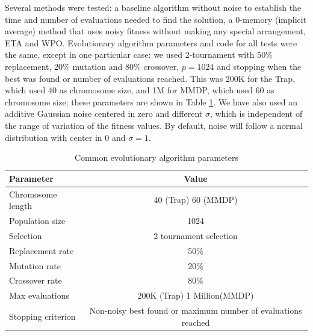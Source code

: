 \documentclass{llncs}
\begin{document}
Several methods were tested: a baseline algorithm without
noise to establish the time and number of evaluations
needed to find the solution, a 0-memory (implicit average) method that
uses noisy fitness without making any special arrangement, ETA and
WPO. Evolutionary algorithm parameters and code for all tests were the
same, except in one
particular case: we used 2-tournament with 50\% replacement, 20\%
mutation and 80\% crossover, $p=1024$ and stopping when the best was
found or number of evaluations reached. This was 200K for the Trap,
which used 40 as chromosome size, and 1M for MMDP, which used 60 as
chromosome size; these parameters are shown in Table \ref{fig:ga_params}. We have also used an additive Gaussian noise centered in zero
and different $\sigma$, which is independent of the range of variation of the fitness values. By default, noise will follow a normal distribution with center in 0 and $\sigma=1$.

\begin{table}[!t]%
\begin{center}
\caption{Common evolutionary algorithm parameters}
\label{fig:ga_params}
\begin{tabular}{lc}%
\hline\noalign{\smallskip}
\noalign{\smallskip}
Parameter & Value \\
\hline
\noalign{\smallskip}
Chromosome length & 40 (Trap) 60 (MMDP)\\
Population size & 1024\\
Selection & 2 tournament selection \\
Replacement rate & 50\% \\
Mutation rate & 20\% \\
Crossover rate &  80\% \\
Max evaluations & 200K (Trap) 1 Million(MMDP) \\
Stopping criterion & Non-noisy best found or maximum number of  evaluations reached \\
\hline
\end{tabular}
\end{center}
\end{table}
\end{document}
